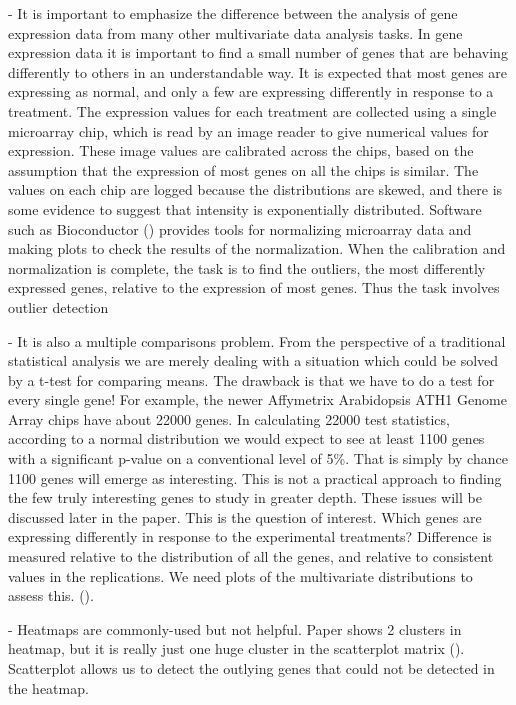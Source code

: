 \documentclass[11pt,a4paper,oldfontcommands,openany]{memoir}
\numberwithin{equation}{section} %
\begin{document}
- It is important to emphasize the difference between the analysis of gene expression data from many other multivariate data analysis tasks. In gene expression data it is important to find a small number of genes that are behaving differently to others in an understandable way. It is expected that most genes are expressing as normal, and only a few are expressing differently in response to a treatment. The expression values for each treatment are collected using a single microarray chip, which is read by an image reader to give numerical values for expression. These image values are calibrated across the chips, based on the assumption that the expression of most genes on all the chips is similar. The values on each chip are logged because the distributions are skewed, and there is some evidence to suggest that intensity is exponentially distributed. Software such as Bioconductor (\citealt{bioconductor}) provides tools for normalizing microarray data and making plots to check the results of the normalization. When the calibration and normalization is complete, the task is to find the outliers, the most differently expressed genes, relative to the expression of most genes. Thus the task involves outlier detection 

- It is also a multiple comparisons problem. From the perspective of a traditional statistical analysis we are merely dealing with a situation which could be solved by a t-test for comparing means. The drawback is that we have to do a test for every single gene! For example, the newer Affymetrix Arabidopsis ATH1 Genome Array chips have about 22000 genes. In calculating 22000 test statistics, according to a normal distribution we would expect to see at least 1100 genes with a significant p-value on a conventional level of 5\%. That is simply by chance 1100 genes will emerge as interesting. This is not a practical approach to finding the few truly interesting genes to study in greater depth. These issues will be discussed later in the paper. This is the question of interest. Which genes are expressing differently in response to the experimental treatments? Difference is measured relative to the distribution of all the genes, and relative to consistent values in the replications. We need plots of the multivariate distributions to assess this. (\citealt{jds}).

- Heatmaps are commonly-used but not helpful. Paper shows 2 clusters in heatmap, but it is really just one huge cluster in the scatterplot matrix (\citealt{jds}). Scatterplot allows us to detect the outlying genes that could not be detected in the heatmap.
\end{document}

